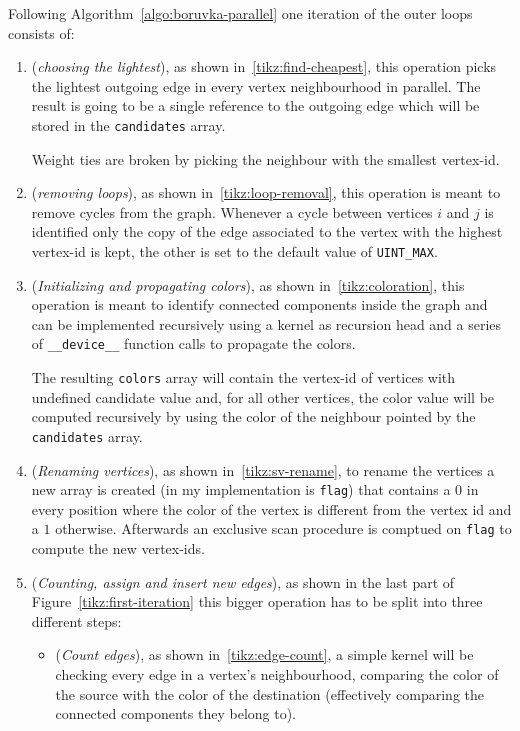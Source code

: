 \documentclass[a4paper,10pt]{article}
\begin{document}
Following Algorithm~\ref{algo:boruvka-parallel} one iteration of the outer loops consists of:
\begin{enumerate}
	\item\label{item:choose-lightest} (\textit{choosing the lightest}), as shown in~\ref{tikz:find-cheapest}, this operation picks the lightest outgoing edge in every vertex neighbourhood in parallel. The result is going to be a single reference to the outgoing edge which will be stored in the \texttt{candidates} array.
	
	Weight ties are broken by picking the neighbour with the smallest vertex-id.
	\item\label{item:mirror-removal} (\textit{removing loops}), as shown in~\ref{tikz:loop-removal}, this operation is meant to remove cycles from the graph. Whenever a cycle between vertices $i$ and $j$ is identified only the copy of the edge associated to the vertex with the highest vertex-id is kept, the other is set to the default value of \texttt{UINT\_MAX}.
	\item\label{item:coloration} (\textit{Initializing and propagating colors}), as shown in~\ref{tikz:coloration}, this operation is meant to identify connected components inside the graph and can be implemented recursively using a kernel as recursion head and a series of \texttt{\_\_device\_\_} function calls to propagate the colors.
	
	The resulting \texttt{colors} array will contain the vertex-id of vertices with undefined candidate value and, for all other vertices, the color value will be computed recursively by using the color of the neighbour pointed by the \texttt{candidates} array.
	\item\label{item:vertex-rename} (\textit{Renaming vertices}), as shown in~\ref{tikz:sv-rename}, to rename the vertices a new array is created (in my implementation is \texttt{flag}) that contains a $0$ in every position where the color of the vertex is different from the vertex id and a $1$ otherwise. Afterwards an exclusive scan procedure is comptued on \texttt{flag} to compute the new vertex-ids.
	\item\label{item:graph-contraction} (\textit{Counting, assign and insert new edges}), as shown in the last part of Figure~\ref{tikz:first-iteration} this bigger operation has to be split into three different steps:
	\begin{itemize}
		\item\label{item:count-edges} (\textit{Count edges}), as shown in~\ref{tikz:edge-count}, a simple kernel will be checking every edge in a vertex's neighbourhood, comparing the color of the source with the color of the destination (effectively comparing the connected components they belong to).
		

\end{itemize}
\end{enumerate}
\end{document}
